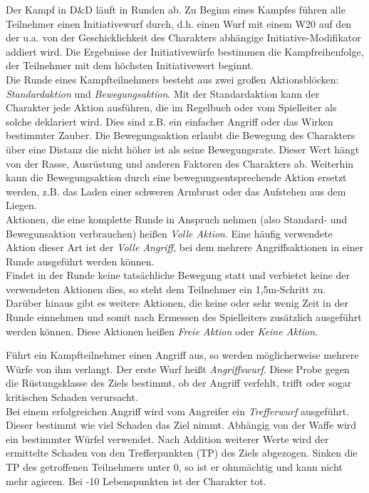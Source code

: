Der Kampf in D\&D läuft in Runden ab. Zu Beginn eines Kampfes führen alle Teilnehmer einen Initiativewurf durch, d.h. einen Wurf mit einem W20 auf den der u.a. von der Geschicklichkeit des Charakters abhängige Initiative-Modifikator addiert wird. Die Ergebnisse der Initiativewürfe bestimmen die Kampfreihenfolge, der Teilnehmer mit dem höchsten Initiativewert beginnt.\\
Die Runde eines Kampfteilnehmers besteht aus zwei großen Aktionsblöcken: \emph{Standardaktion} und \emph{Bewegungsaktion}. Mit der Standardaktion kann der Charakter jede Aktion ausführen, die im Regelbuch oder vom Spielleiter als solche deklariert wird. Dies sind z.B. ein einfacher Angriff oder das Wirken bestimmter Zauber. Die Bewegungsaktion erlaubt die Bewegung des Charakters über eine Distanz die nicht höher ist als seine Bewegungsrate. Dieser Wert hängt von der Rasse, Ausrüstung und anderen Faktoren des Charakters ab. Weiterhin kann die Bewegungsaktion durch eine bewegungsentsprechende Aktion ersetzt werden, z.B. das Laden einer schweren Armbrust oder das Aufstehen aus dem Liegen.\\
Aktionen, die eine komplette Runde in Anspruch nehmen (also Standard- und Bewegunsaktion verbrauchen) heißen \emph{Volle %
Aktion}. Eine häufig verwendete Aktion dieser Art ist der \emph{Volle Angriff}, bei dem mehrere Angriffsaktionen in einer Runde ausgeführt werden können.\\
Findet in der Runde keine tatsächliche Bewegung statt und verbietet keine der verwendeten Aktionen dies, so steht dem Teilnehmer ein 1,5m-Schritt zu.\\
Darüber hinaus gibt es weitere Aktionen, die keine oder sehr wenig Zeit in der Runde einnehmen und somit nach Ermessen des Spielleiters zusätzlich ausgeführt werden können. Diese Aktionen heißen \emph{Freie Aktion} oder \emph{Keine Aktion}.

Führt ein Kampfteilnehmer einen Angriff aus, so werden möglicherweise mehrere Würfe von ihm verlangt. Der erste Wurf heißt \emph{Angriffswurf}. Diese Probe gegen die Rüstungsklasse des Ziels bestimmt, ob der Angriff verfehlt, trifft oder sogar kritischen Schaden verursacht.\\
Bei einem erfolgreichen Angriff wird vom Angreifer ein \emph{Trefferwurf} ausgeführt. Dieser bestimmt wie viel Schaden das Ziel nimmt. Abhängig von der Waffe wird ein bestimmter Würfel verwendet. Nach Addition weiterer Werte wird der ermittelte Schaden von den Trefferpunkten (TP) des Ziels abgezogen. Sinken die TP des getroffenen Teilnehmers unter 0, so ist er ohnmächtig und kann nicht mehr agieren. Bei -10 Lebenspunkten ist der Charakter tot.

